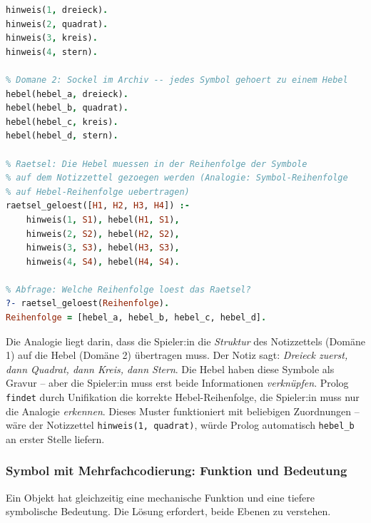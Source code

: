 \documentclass[parskip=half,a4paper,11pt]{scrreprt}
\begin{document}
\begin{lstlisting}[language=Prolog, caption={}]
% Domane 1: Notizzettel (gefunden im Labor) -- Reihenfolge der Symbole
hinweis(1, dreieck).
hinweis(2, quadrat).
hinweis(3, kreis).
hinweis(4, stern).

% Domane 2: Sockel im Archiv -- jedes Symbol gehoert zu einem Hebel
hebel(hebel_a, dreieck).
hebel(hebel_b, quadrat).
hebel(hebel_c, kreis).
hebel(hebel_d, stern).

% Raetsel: Die Hebel muessen in der Reihenfolge der Symbole
% auf dem Notizzettel gezoegen werden (Analogie: Symbol-Reihenfolge
% auf Hebel-Reihenfolge uebertragen)
raetsel_geloest([H1, H2, H3, H4]) :-
    hinweis(1, S1), hebel(H1, S1),
    hinweis(2, S2), hebel(H2, S2),
    hinweis(3, S3), hebel(H3, S3),
    hinweis(4, S4), hebel(H4, S4).

% Abfrage: Welche Reihenfolge loest das Raetsel?
?- raetsel_geloest(Reihenfolge).
Reihenfolge = [hebel_a, hebel_b, hebel_c, hebel_d].
\end{lstlisting}

Die Analogie liegt darin, dass die Spieler:in die \textit{Struktur} des Notizzettels (Domäne 1) auf die Hebel (Domäne 2) übertragen muss. Der Notiz sagt: \textit{Dreieck zuerst, dann Quadrat, dann Kreis, dann Stern}. Die Hebel haben diese Symbole als Gravur – aber die Spieler:in muss erst beide Informationen \textit{verknüpfen}. Prolog \texttt{findet} durch Unifikation die korrekte Hebel-Reihenfolge, die Spieler:in muss nur die Analogie \emph{erkennen}. Dieses Muster funktioniert mit beliebigen Zuordnungen – wäre der Notizzettel \texttt{hinweis(1, quadrat)}, würde Prolog automatisch \texttt{hebel\_b} an erster Stelle liefern.

\subsubsection{Symbol mit Mehrfachcodierung: Funktion und Bedeutung}

Ein Objekt hat gleichzeitig eine mechanische Funktion und eine tiefere symbolische Bedeutung. Die Lösung erfordert, beide Ebenen zu verstehen.
\end{document}
